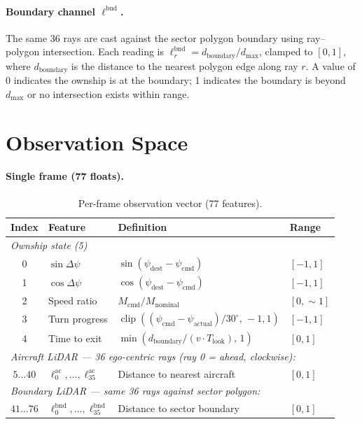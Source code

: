 \documentclass[11pt, a4paper]{article}
\begin{document}
\paragraph{Boundary channel $\boldsymbol{\ell}^\text{bnd}$.}
The same 36 rays are cast against the sector polygon boundary using ray–polygon
intersection.
Each reading is $\ell^\text{bnd}_r = d_\text{boundary}/d_\text{max}$, clamped
to $[0,1]$, where $d_\text{boundary}$ is the distance to the nearest polygon
edge along ray $r$.
A value of 0 indicates the ownship is at the boundary; 1 indicates the
boundary is beyond $d_\text{max}$ or no intersection exists within range.

\section{Observation Space}

\paragraph{Single frame (77 floats).}

\begin{table}[h]
\centering
\caption{Per-frame observation vector (77 features).}
\label{tab:obs}
\smallskip
\begin{tabular}{clll}
\toprule
\textbf{Index} & \textbf{Feature} & \textbf{Definition} & \textbf{Range} \\
\midrule
\multicolumn{4}{l}{\textit{Ownship state (5)}} \\[2pt]
0 & $\sin\Delta\psi$ & $\sin(\psi_\text{dest}-\psi_\text{cmd})$ & $[-1,1]$ \\[2pt]
1 & $\cos\Delta\psi$ & $\cos(\psi_\text{dest}-\psi_\text{cmd})$ & $[-1,1]$ \\[2pt]
2 & Speed ratio      & $M_\text{cmd}/M_\text{nominal}$           & $[0,\sim\!1]$ \\[2pt]
3 & Turn progress    & $\operatorname{clip}((\psi_\text{cmd}-\psi_\text{actual})/30^\circ,\,-1,1)$ & $[-1,1]$ \\[2pt]
4 & Time to exit     & $\min(d_\text{boundary}/(v\cdot T_\text{look}),\,1)$ & $[0,1]$ \\[4pt]
\multicolumn{4}{l}{\textit{Aircraft LiDAR — 36 ego-centric rays (ray 0 = ahead, clockwise):}} \\[2pt]
$5\ldots40$   & $\ell^\text{ac}_0,\ldots,\ell^\text{ac}_{35}$   & Distance to nearest aircraft & $[0,1]$ \\[4pt]
\multicolumn{4}{l}{\textit{Boundary LiDAR — same 36 rays against sector polygon:}} \\[2pt]
$41\ldots76$  & $\ell^\text{bnd}_0,\ldots,\ell^\text{bnd}_{35}$ & Distance to sector boundary  & $[0,1]$ \\
\bottomrule
\end{tabular}
\end{table}
\end{document}
